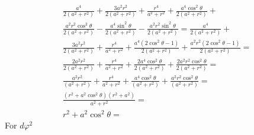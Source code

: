 \begin{align}
     & \frac{a^4}{2\left(a^2+r^2\right)}+\frac{3 a^2 r^2}{2\left(a^2+r^2\right)}+\frac{r^4}{a^2+r^2}+\frac{a^4 \cos ^2 \theta}{2\left(a^2+r^2\right)}+                                                    \\
     & \frac{a^2 r^2 \cos ^2 \theta}{2\left(a^2+r^2\right)}-\frac{a^4 \sin ^2 \theta}{2\left(a^2+r^2\right)}-\frac{a^2 r^2 \sin ^2 \theta}{2\left(a^2+r^2\right)}=\frac{a^4}{2\left(a^2+r^2\right)}+      \\
     & \frac{3 a^2 r^2}{2\left(a^2+r^2\right)}+\frac{r^4}{a^2+r^2}+\frac{a^4\left(2 \cos ^2 \theta-1\right)}{2\left(a^2+r^2\right)}+\frac{a^2 r^2\left(2 \cos ^2 \theta-1\right)}{2\left(a^2+r^2\right)}= \\
     & \frac{2 a^2 r^2}{2\left(a^2+r^2\right)}+\frac{r^4}{a^2+r^2}+\frac{2 a^4 \cos ^2 \theta}{2\left(a^2+r^2\right)}+\frac{2 a^2 r^2 \cos ^2 \theta}{2\left(a^2+r^2\right)}=                             \\
     & \frac{a^2 r^2}{\left(a^2+r^2\right)}+\frac{r^4}{a^2+r^2}+\frac{a^4 \cos ^2 \theta}{\left(a^2+r^2\right)}+\frac{a^2 r^2 \cos ^2 \theta}{\left(a^2+r^2\right)}=                                      \\
     & \frac{\left(r^2+a^2 \cos ^2 \theta\right)\left(r^2+a^2\right)}{a^2+r^2}=                                                                                                                           \\
     & r^2+a^2 \cos ^2 \theta=
\end{align}
For $ d \varphi^2$

